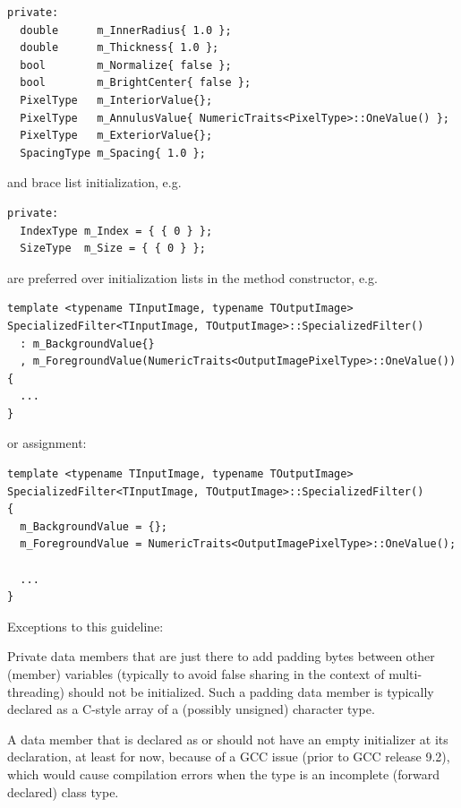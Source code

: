 \small
\begin{verbatim}
private:
  double      m_InnerRadius{ 1.0 };
  double      m_Thickness{ 1.0 };
  bool        m_Normalize{ false };
  bool        m_BrightCenter{ false };
  PixelType   m_InteriorValue{};
  PixelType   m_AnnulusValue{ NumericTraits<PixelType>::OneValue() };
  PixelType   m_ExteriorValue{};
  SpacingType m_Spacing{ 1.0 };
\end{verbatim}
\normalsize

and brace list initialization, e.g.

\small
\begin{verbatim}
private:
  IndexType m_Index = { { 0 } };
  SizeType  m_Size = { { 0 } };
\end{verbatim}
\normalsize

are preferred over initialization lists in the method constructor, e.g.

\small
\begin{verbatim}
template <typename TInputImage, typename TOutputImage>
SpecializedFilter<TInputImage, TOutputImage>::SpecializedFilter()
  : m_BackgroundValue{}
  , m_ForegroundValue(NumericTraits<OutputImagePixelType>::OneValue())
{
  ...
}
\end{verbatim}
\normalsize

or assignment:

\small
\begin{verbatim}
template <typename TInputImage, typename TOutputImage>
SpecializedFilter<TInputImage, TOutputImage>::SpecializedFilter()
{
  m_BackgroundValue = {};
  m_ForegroundValue = NumericTraits<OutputImagePixelType>::OneValue();

  ...
}
\end{verbatim}
\normalsize

Exceptions to this guideline:

Private data members that are just there to add padding bytes between other
(member) variables (typically to avoid false sharing in the context of
multi-threading) should not be initialized. Such a padding data member is
typically declared as a C-style array of a (possibly unsigned) character type.

A data member that is declared as  or
 should not have an empty \code{\{\}} initializer at
its declaration, at least for now, because of a GCC issue (prior to GCC release
9.2), which would cause compilation errors when the type  is an
incomplete (forward declared) class type.


